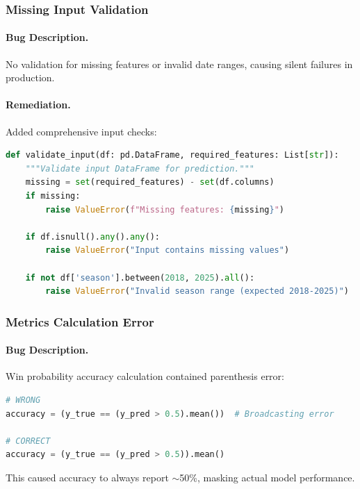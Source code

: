 \subsubsection{Missing Input Validation}

\paragraph{Bug Description.}
No validation for missing features or invalid date ranges, causing silent failures in production.

\paragraph{Remediation.}
Added comprehensive input checks:

\begin{lstlisting}[language=Python,style=codestyle,caption={Input Validation},label={lst:input-validation}]
def validate_input(df: pd.DataFrame, required_features: List[str]):
    """Validate input DataFrame for prediction."""
    missing = set(required_features) - set(df.columns)
    if missing:
        raise ValueError(f"Missing features: {missing}")

    if df.isnull().any().any():
        raise ValueError("Input contains missing values")

    if not df['season'].between(2018, 2025).all():
        raise ValueError("Invalid season range (expected 2018-2025)")
\end{lstlisting}

\subsubsection{Metrics Calculation Error}

\paragraph{Bug Description.}
Win probability accuracy calculation contained parenthesis error:

\begin{lstlisting}[language=Python,style=codestyle]
# WRONG
accuracy = (y_true == (y_pred > 0.5).mean())  # Broadcasting error

# CORRECT
accuracy = (y_true == (y_pred > 0.5)).mean()
\end{lstlisting}

This caused accuracy to always report $\sim$50\%, masking actual model performance.

